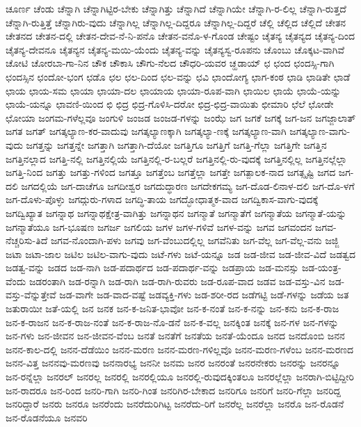 {ಚೂರ್ಣ
ಚೆಂಡು
ಚೆನ್ನಾಗಿ
ಚೆನ್ನಾಗಿಟ್ಟಿರ-ಬೇಕು
ಚೆನ್ನಾಗಿತ್ತು
ಚೆನ್ನಾಗಿದೆ
ಚೆನ್ನಾಗಿಯೇ
ಚೆನ್ನಾಗಿ-ರ-ಲಿಲ್ಲ
ಚೆನ್ನಾಗಿ-ರುತ್ತದೆ
ಚೆನ್ನಾಗಿ-ರುತ್ತಿತ್ತೆ
ಚೆನ್ನಾಗಿರು-ವುದು
ಚೆನ್ನಾಗಿಲ್ಲ
ಚೆನ್ನಾಗಿಲ್ಲ-ದಿದ್ದರೂ
ಚೆನ್ನಾಗಿಲ್ಲ-ದಿದ್ದರೆ
ಚೆಲ್ಲಿ
ಚೆಲ್ಲಿದ
ಚೆಲ್ಲಿದೆ
ಚೇತನ
ಚೇತನದ
ಚೇತನ-ದಲ್ಲಿ
ಚೇತನ-ದೇವ-ನೆ-ನಿ-ಪನೊ
ಚೇತನ-ವನೊ-ಳ-ಗೊಂಡ
ಚೇಷ್ಟಂ
ಚೈತನ್ಯ
ಚೈತನ್ಯದ
ಚೈತನ್ಯ-ದಿಂದ
ಚೈತನ್ಯ-ದೇವನೂ
ಚೈತನ್ಯನ
ಚೈತನ್ಯ-ಮಯಿ-ಯೆಂದು
ಚೈತನ್ಯ-ವನ್ನು
ಚೈತನ್ಯಸ್ವ-ರೂಪನು
ಚೊಂಬು
ಚೊಕ್ಕಟ-ವಾಗಿವೆ
ಚೋಟಿ
ಚೋರಬಾ-ಗಾ-ನಿನ
ಚೌಕ
ಚೌಕಾಸಿ
ಚೌಗು-ನೆಲದ
ಚೌಧರಿ-ಯವರ
ಚ್ಹಡಾಯ್
ಛ
ಛಂದ
ಛಂದಸ್ಸಿ-ಗಾಗಿ
ಛಂದಸ್ಸಿನ
ಛಂದೋ-ಭಂಗ
ಛಡೊ
ಛಲ
ಛಲ-ದಿಂದ
ಛಲ-ವನ್ನು
ಛವಿ
ಛಾಂದೋಗ್ಯ
ಛಾಗ-ಕಂಠ
ಛಾಡಿ
ಛಾಡಿತೇ
ಛಾಡೆ
ಛಾಯ
ಛಾಯ-ಸಮ
ಛಾಯಾ
ಛಾಯಾ-ದಲ
ಛಾಯಾಯ
ಛಾಯಾ-ರೂಪ-ವಾಗಿ
ಛಾಯಿಲ
ಛಾಯೆ
ಛಾಯೆ-ಯನ್ನು
ಛಾಯೆ-ಯನ್ನೂ
ಛಾವಣಿ-ಯಿಂದ
ಛಿ
ಛಿದ್ರ
ಛಿದ್ರ-ಗೊಳಿಸಿ-ದರೋ
ಛಿದ್ರ-ಛಿದ್ರ-ವಾಯಿತು
ಛೀಮಾರಿ
ಛೆಲೆ
ಛೋಡೇ
ಛೋಯಾ
ಜಂಗಮ-ಗಳೆಲ್ಲವೂ
ಜಂಗುಳಿ
ಜಂಜಡ
ಜಂಜಡ-ಗಳನ್ನು
ಜಂಝೆ
ಜಗ
ಜಗಕೆ
ಜಗಕ್ಕೆ
ಜಗ-ಜನ
ಜಗಜ್ಜಾಲಾತ್
ಜಗತ
ಜಗತ್
ಜಗತ್ಕಲ್ಯಾಣ-ಕರ-ವಾದುವು
ಜಗತ್ಕಲ್ಯಾಣಕ್ಕಾಗಿ
ಜಗತ್ಕಲ್ಯಾ-ಣಕ್ಕೆ
ಜಗತ್ಕಲ್ಯಾಣ-ವಾಗಿ
ಜಗತ್ಕಲ್ಯಾಣ-ವಾಗು-ವುದು
ಜಗತ್ತನ್ನು
ಜಗತ್ತನ್ನೇ
ಜಗತ್ತಾಗಿ
ಜಗತ್ತಾಗಿ-ದೆಯೋ
ಜಗತ್ತಿಗೂ
ಜಗತ್ತಿಗೆ
ಜಗತ್ತಿ-ಗೆಲ್ಲಾ
ಜಗತ್ತಿಗೇ
ಜಗತ್ತಿನ
ಜಗತ್ತಿನಲ್ಲಾದ
ಜಗತ್ತಿ-ನಲ್ಲಿ
ಜಗತ್ತಿನಲ್ಲಿಯೆ
ಜಗತ್ತಿನಲ್ಲಿ-ರ-ಬಲ್ಲರೆ
ಜಗತ್ತಿನಲ್ಲಿ-ರು-ವುದಕ್ಕೆ
ಜಗತ್ತಿನಲ್ಲಿಲ್ಲ
ಜಗತ್ತಿನಲ್ಲೆಲ್ಲಾ
ಜಗತ್ತಿ-ನಿಂದ
ಜಗತ್ತು
ಜಗತ್ತು-ಗಳಿಂದ
ಜಗತ್ತೂ
ಜಗತ್ತೆಂಬ
ಜಗತ್ತೆಲ್ಲಾ
ಜಗತ್ತೇ
ಜಗತ್ಪಾಲಕ-ನಾದ
ಜಗತ್ಸೃಷ್ಟಿ
ಜಗದ
ಜಗ-ದಲಿ
ಜಗದಲ್ಲಿಯೆ
ಜಗ-ದಾಚೆಗೂ
ಜಗದೀಶ್ವರ
ಜಗದುದ್ಧಾರಣ
ಜಗದೇಕಗಮ್ಯ
ಜಗ-ದೊಡ-ಲಿನಾಳ-ದಲಿ
ಜಗ-ದೊ-ಳಗೆ
ಜಗ-ದೊಳು-ಪೊಳ್ಳು
ಜಗದ್ಗುರು-ಗಳಾದ
ಜಗದ್ಧಿ-ತಾಯ
ಜಗದ್ಭೋಧಾತ್ಮಕ-ವಾದ
ಜಗದ್ವಿಕಾಸ-ವಾಗು-ವುದಕ್ಕೆ
ಜಗದ್ವಿಖ್ಯಾತ
ಜಗನ್ನಾಥ
ಜಗನ್ನಾಥಕ್ಷೇತ್ರ-ವಾಗಿತ್ತು
ಜಗನ್ನಾಥನ
ಜಗನ್ಮಾತೆ
ಜಗನ್ಮಾತೆಗೆ
ಜಗನ್ಮಾತೆಯ
ಜಗನ್ಮಾತೆ-ಯನ್ನು
ಜಗನ್ಮಾತೆಯೂ
ಜಗ-ಭೂಷಣ
ಜಗರ್ಜ
ಜಗಲಿಯ
ಜಗಳ
ಜಗಳ-ಗಳಿವೆ
ಜಗಳ-ವನ್ನು
ಜಗವ
ಜಗವಂದನ
ಜಗವ-ನೆಚ್ಚರಿಸು-ತಿದೆ
ಜಗವ-ನೊಂದಾಗಿ-ಪಳು
ಜಗವು
ಜಗ-ವೆಂಬುದಲ್ಲಿಲ್ಲ
ಜಗವೆನಿತು
ಜಗ-ವೆಲ್ಲ
ಜಗ-ವೆಲ್ಲ-ವನು
ಜಜ್ಜಿ
ಜಟಾ
ಜಟಾ-ಜಾಲ
ಜಟಿಲ
ಜಟಿಲ-ವಾಗು-ವುದು
ಜಟೆ-ಗಳು
ಜಟೆ-ಯನ್ನೂ
ಜಡ
ಜಡ-ಜೀವ
ಜಡ-ಜೀವ-ವಿದೆ
ಜಡತ್ವದ
ಜಡತ್ವ-ವನ್ನು
ಜಡದ
ಜಡ-ನಾಗಿ
ಜಡ-ಪದಾರ್ಥದ
ಜಡ-ಪದಾರ್ಥ-ವನ್ನು
ಜಡಪ್ರಾಯ
ಜಡ-ಮನಸ್ಸು
ಜಡ-ಯಂತ್ರ-ವೆಂದು
ಜಡರಂತಾಗಿ
ಜಡ-ರನ್ನಾಗಿ
ಜಡ-ರಾಗಿ
ಜಡ-ರಾಗಿ-ರುವರು
ಜಡ-ರೂಪ-ವಾದ
ಜಡವ
ಜಡ-ವಸ್ತು-ವಿನ
ಜಡ-ವಸ್ತು-ವೆನ್ನುತ್ತೇವೆ
ಜಡ-ವಾಗೇ
ಜಡ-ವಾದ-ವಷ್ಟೆ
ಜಡವ್ಯಕ್ತಿ-ಗಳು
ಜಡ-ಶರೀ-ರದ
ಜಡೆಗಟ್ಟಿ
ಜಡೆ-ಗಳನ್ನು
ಜಡೆಯ
ಜತ
ಜತುರಾಯೀ
ಜತೆ-ಯಲ್ಲಿ
ಜನ
ಜನಕ
ಜನ-ಕ-ಜನಿತ-ಭಾವೋ
ಜನ-ಕ-ನಂತೆ
ಜನ-ಕ-ನನ್ನು
ಜನ-ಕನು
ಜನ-ಕ-ರಾಜ
ಜನ-ಕ-ರಾಜನ
ಜನ-ಕ-ರಾಜ-ನಂತೆ
ಜನ-ಕ-ರಾಜ-ನೊ-ಡನೆ
ಜನ-ಕ-ವಲ್ಲ
ಜನಕ್ಕಿಂತ
ಜನಕ್ಕೆ
ಜನ-ಗಳ
ಜನ-ಗಳನ್ನು
ಜನ-ಗಳು
ಜನ-ಜೀವನ
ಜನ-ಜೀವನ-ವೆಂಬ
ಜನತೆ
ಜನತೆಗೆ
ಜನತೆಯ
ಜನತೆ-ಯೆಂದೂ
ಜನದ
ಜನದೊಂಬಿ
ಜನನ
ಜನನ-ಕಾಲ-ದಲ್ಲಿ
ಜನನ-ದೆಡೆಯಿಂ
ಜನನ-ಮರಣ
ಜನನ-ಮರಣ-ಗಳಿಲ್ಲವೊ
ಜನನ-ಮರಣ-ಗಳೆಂಬ
ಜನನ-ಮರಣದ
ಜನನ-ವಿತ್ತ
ಜನನವು-ಮರಣವು
ಜನನಾರಭ್ಯ
ಜನನೀ
ಜನಮ
ಜನರ
ಜನರಂತೆ
ಜನರನೇಕರು
ಜನರನ್ನು
ಜನರನ್ನೂ
ಜನ-ರನ್ನೆಲ್ಲಾ
ಜನರಲ್
ಜನರಲ್ಲ
ಜನರಲ್ಲಿ
ಜನರಲ್ಲಿಯೂ
ಜನರಲ್ಲಿ-ರುವುದಕ್ಕಿಂತಲೂ
ಜನರಲ್ಲೆಲ್ಲಾ
ಜನರಾಗಿ-ಬಿಟ್ಟಿದ್ದೀರಿ
ಜನ-ರಾದರೂ
ಜನ-ರಿಂದ
ಜನರಿ-ಗಾಗಿ
ಜನರಿ-ಗಿಂತ
ಜನರಿಗಿರ-ಬೇಕಾದ
ಜನರಿಗೂ
ಜನರಿಗೆ
ಜನರಿ-ಗೆಲ್ಲಾ
ಜನರಿದ್ದ
ಜನರಿದ್ದಾರೆ
ಜನರು
ಜನರೂ
ಜನರೆಂದು
ಜನರೆದುರಿಗಿಟ್ಟ
ಜನರೆದು-ರಿಗೆ
ಜನರೆಲ್ಲ
ಜನರೆಲ್ಲಾ
ಜನರೊ
ಜನ-ರೊಡನೆ
ಜನ-ರೊಡನೆಯೂ
ಜನವರಿ
}
